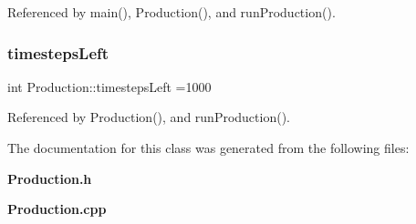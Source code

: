 Referenced by main(), Production(), and run\+Production().

\mbox{\label{classProduction_a5fcf03b482712c458184ae4fd3f8e461}} 
\subsubsection{timesteps\+Left}
{\footnotesize\ttfamily int Production\+::timesteps\+Left =1000}



Referenced by Production(), and run\+Production().



The documentation for this class was generated from the following files\+:\begin{DoxyCompactItemize}
\item 
\textbf{ Production.\+h}\item 
\textbf{ Production.\+cpp}\end{DoxyCompactItemize}
